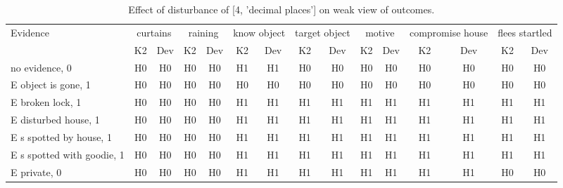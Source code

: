 \begin{table}\begin{tabular}{l|cc|cc|cc|cc|cc|cc|cc}\toprule\multirow{2}{*}{Evidence} & \multicolumn{2}{c}{curtains}& \multicolumn{2}{c}{raining}& \multicolumn{2}{c}{know object}& \multicolumn{2}{c}{target object}& \multicolumn{2}{c}{motive}& \multicolumn{2}{c}{compromise house}& \multicolumn{2}{c}{flees startled}\\& {K2} & {Dev}& {K2} & {Dev}& {K2} & {Dev}& {K2} & {Dev}& {K2} & {Dev}& {K2} & {Dev}& {K2} & {Dev}\\\midrule
no evidence, 0 & H0&H0&H0&H0&H1&H1&H0&H0&H0&H0&H0&H0&H0&H0\\E object is gone, 1 & H0&H0&H0&H0&H0&H0&H0&H0&H0&H0&H0&H0&H0&H0\\E broken lock, 1 & H0&H0&H0&H0&H1&H1&H1&H1&H1&H1&H1&H1&H1&H1\\E disturbed house, 1 & H0&H0&H0&H0&H1&H1&H1&H1&H1&H1&H1&H1&H1&H1\\E s spotted by house, 1 & H0&H0&H0&H0&H1&H1&H1&H1&H1&H1&H1&H1&H1&H1\\E s spotted with goodie, 1 & H0&H0&H0&H0&H1&H1&H1&H1&H1&H1&H1&H1&H1&H1\\E private, 0 & H0&H0&H0&H0&H1&H1&H1&H1&H1&H1&H1&H1&H0&H0\\\bottomrule\end{tabular}\caption{Effect of disturbance of [4, 'decimal places'] on weak view of outcomes.}\end{table}